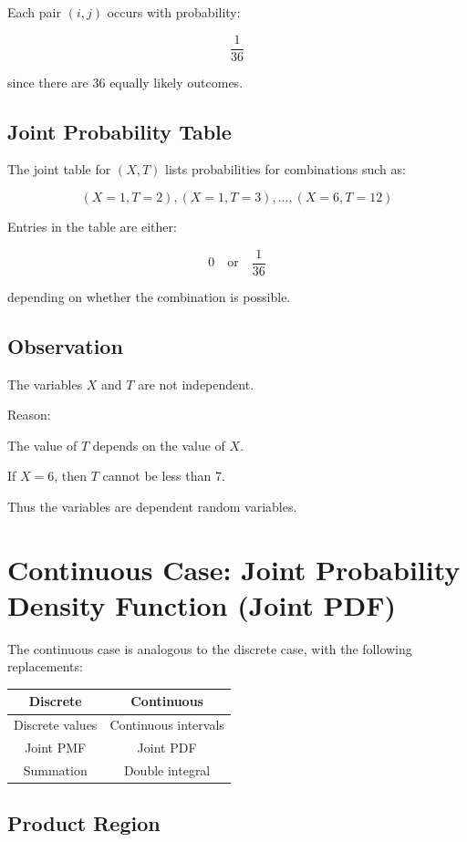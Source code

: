 \documentclass[12pt]{article}
\begin{document}
Each pair $(i,j)$ occurs with probability:

\[
\frac{1}{36}
\]

since there are 36 equally likely outcomes.

\subsection*{Joint Probability Table}

The joint table for $(X,T)$ lists probabilities for combinations such as:

\[
(X=1,T=2),(X=1,T=3),...,(X=6,T=12)
\]

Entries in the table are either:

\[
0 \quad \text{or} \quad \frac{1}{36}
\]

depending on whether the combination is possible.

\subsection*{Observation}

The variables $X$ and $T$ are not independent.

Reason:

The value of $T$ depends on the value of $X$.

If $X=6$, then $T$ cannot be less than 7.

Thus the variables are dependent random variables.

\section{Continuous Case: Joint Probability Density Function (Joint PDF)}

The continuous case is analogous to the discrete case, with the following replacements:

\begin{center}
\begin{tabular}{|c|c|}
\hline
Discrete & Continuous \\
\hline
Discrete values & Continuous intervals \\
Joint PMF & Joint PDF \\
Summation & Double integral \\
\hline
\end{tabular}
\end{center}

\subsection*{Product Region}
\end{document}

